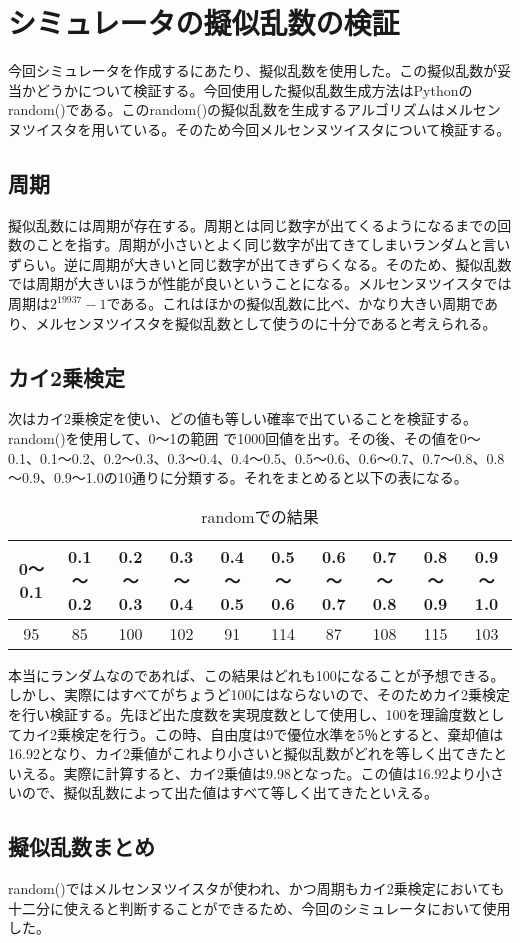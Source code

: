 \section{シミュレータの擬似乱数の検証}
今回シミュレータを作成するにあたり、擬似乱数を使用した。この擬似乱数が妥当かどうかについて検証する。今回使用した擬似乱数生成方法はPythonのrandom()である。このrandom()の擬似乱数を生成するアルゴリズムはメルセンヌツイスタを用いている。そのため今回メルセンヌツイスタについて検証する。
\subsection{周期}
擬似乱数には周期が存在する。周期とは同じ数字が出てくるようになるまでの回数のことを指す。周期が小さいとよく同じ数字が出てきてしまいランダムと言いずらい。逆に周期が大きいと同じ数字が出てきずらくなる。そのため、擬似乱数では周期が大きいほうが性能が良いということになる。メルセンヌツイスタでは周期は$2^{19937}-1$である。これはほかの擬似乱数に比べ、かなり大きい周期であり、メルセンヌツイスタを擬似乱数として使うのに十分であると考えられる。
\subsection{カイ2乗検定}
次はカイ2乗検定を使い、どの値も等しい確率で出ていることを検証する。random()を使用して、0～1の範囲
で1000回値を出す。その後、その値を0～0.1、0.1～0.2、0.2～0.3、0.3～0.4、0.4～0.5、0.5～0.6、0.6～0.7、0.7～0.8、0.8～0.9、0.9～1.0の10通りに分類する。それをまとめると以下の表になる。
\begin{table}[H]
 \begin{center}
  \begin{tabular}{|c|c|c|c|c|c|c|c|c|c|}
    \hline    0～0.1 &  0.1～0.2 & 0.2～0.3 & 0.3～0.4 &  0.4～0.5 & 0.5～0.6 & 0.6～0.7 & 0.7～0.8 & 0.8～0.9 & 0.9～1.0 \\
    \hline 95 & 85 & 100 & 102 & 91 & 114 & 87 & 108 & 115 & 103 \\
    \hline
  \end{tabular}
 \end{center}
 \caption{randomでの結果}
\end{table}
本当にランダムなのであれば、この結果はどれも100になることが予想できる。しかし、実際にはすべてがちょうど100にはならないので、そのためカイ2乗検定を行い検証する。先ほど出た度数を実現度数として使用し、100を理論度数としてカイ2乗検定を行う。この時、自由度は9で優位水準を5％とすると、棄却値は16.92となり、カイ2乗値がこれより小さいと擬似乱数がどれを等しく出てきたといえる。実際に計算すると、カイ2乗値は9.98となった。この値は16.92より小さいので、擬似乱数によって出た値はすべて等しく出てきたといえる。
\subsection{擬似乱数まとめ}
random()ではメルセンヌツイスタが使われ、かつ周期もカイ2乗検定においても十二分に使えると判断することができるため、今回のシミュレータにおいて使用した。
